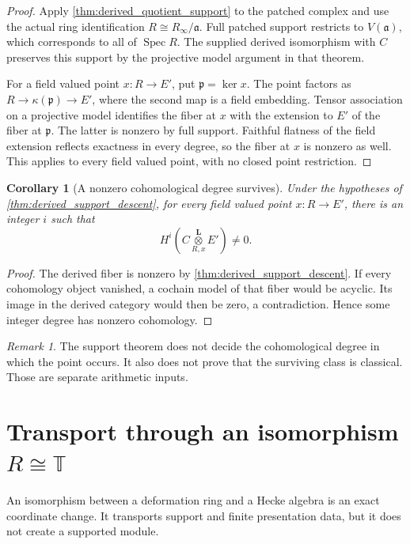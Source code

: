 \documentclass[11pt]{amsart}
\newtheorem{corollary}[corollary]{Corollary}
\theoremstyle{definition}
\theoremstyle{remark}
\newtheorem{remark}[remark]{Remark}
\newcommand{\TT}{\mathbb T}
\newcommand{\Spec}{\operatorname{Spec}}
\newcommand{\frakp}{\mathfrak p}
\newcommand{\fraka}{\mathfrak a}
\begin{document}
\begin{proof}
Apply \cref{thm:derived_quotient_support} to the patched complex and use the actual ring identification \(R\cong R_\infty/\fraka\). Full patched support restricts to \(V(\fraka)\), which corresponds to all of \(\Spec R\). The supplied derived isomorphism with \(C\) preserves this support by the projective model argument in that theorem.

For a field valued point \(x:R\to E'\), put \(\frakp=\ker x\). The point factors as \(R\to\kappa(\frakp)\to E'\), where the second map is a field embedding. Tensor association on a projective model identifies the fiber at \(x\) with the extension to \(E'\) of the fiber at \(\frakp\). The latter is nonzero by full support. Faithful flatness of the field extension reflects exactness in every degree, so the fiber at \(x\) is nonzero as well. This applies to every field valued point, with no closed point restriction.
\end{proof}

\begin{corollary}[A nonzero cohomological degree survives]\label{cor:derived_degree_survives}
Under the hypotheses of \cref{thm:derived_support_descent}, for every field valued point \(x:R\to E'\), there is an integer \(i\) such that
\[
H^i
\left(
C\mathbin{\mathop{\otimes}\limits_{R,x}^{\mathbf L}}E'
\right)
\neq0.
\]
\end{corollary}

\begin{proof}
The derived fiber is nonzero by \cref{thm:derived_support_descent}. If every cohomology object vanished, a cochain model of that fiber would be acyclic. Its image in the derived category would then be zero, a contradiction. Hence some integer degree has nonzero cohomology.
\end{proof}

\begin{remark}
The support theorem does not decide the cohomological degree in which the point occurs. It also does not prove that the surviving class is classical. Those are separate arithmetic inputs.
\end{remark}

\section{Transport through an isomorphism \texorpdfstring{\(R\cong\TT\)}{R equals T}}\label{sec:rt}

An isomorphism between a deformation ring and a Hecke algebra is an exact coordinate change. It transports support and finite presentation data, but it does not create a supported module.
\end{document}
